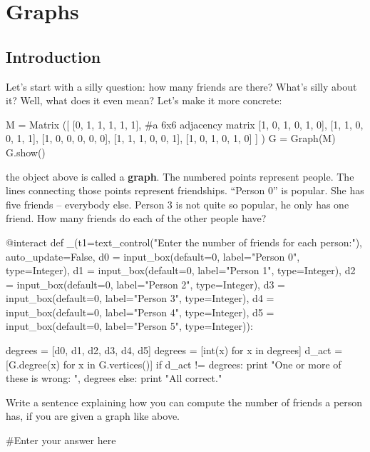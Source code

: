 \chapter{Graphs}

\section{Introduction}

Let's start with a silly question:  how many friends are there?
What's silly about it?  Well, what does it even mean?  Let's make it
more concrete:

\begin{sageverbatim}
M = Matrix ([ [0, 1, 1, 1, 1, 1],   #a 6x6 adjacency matrix
              [1, 0, 1, 0, 1, 0], 
              [1, 1, 0, 0, 1, 1],
              [1, 0, 0, 0, 0, 0],
              [1, 1, 1, 0, 0, 1],
              [1, 0, 1, 0, 1, 0] ] )
G = Graph(M)
G.show()
\end{sageverbatim}

the object above is called a \textbf{graph}.  The numbered points
represent people.  The lines connecting those points represent
friendships.  ``Person 0'' is popular.  She has five friends --
everybody else.  Person 3 is not quite so popular, he only has one
friend.  How many friends do each of the other people have?

\begin{sageverbatim}
@interact
def _(t1=text_control("Enter the number of friends for each person:"), auto_update=False, 
    d0 = input_box(default=0, label="Person 0", type=Integer),
    d1 = input_box(default=0, label="Person 1", type=Integer),
    d2 = input_box(default=0, label="Person 2", type=Integer),
    d3 = input_box(default=0, label="Person 3", type=Integer),
    d4 = input_box(default=0, label="Person 4", type=Integer),
    d5 = input_box(default=0, label="Person 5", type=Integer)):

    degrees = [d0, d1, d2, d3, d4, d5]
    degrees = [int(x) for x in degrees]
    d_act = [G.degree(x) for x in G.vertices()]
    if d_act != degrees:
        print "One or more of these is wrong: ", degrees
    else:
        print "All correct."
\end{sageverbatim}

Write a sentence explaining how you can compute the number of friends
a person has, if you are given a graph like above.

\begin{sageverbatim}
#Enter your answer here

\end{sageverbatim}

